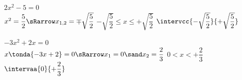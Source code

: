 {\(2x^2-5 = 0\) \\ 
\(x^2 =\dfrac{5}{2} \sRarrow x_{1, 2}= \mp \sqrt{\dfrac{5}{2}}\)}
{
  {}}
{
  {\(-\sqrt{\dfrac{5}{2}} \leqslant x \leqslant +\sqrt{\dfrac{5}{2}}\)}
  {\(\intervcc{-\sqrt{\dfrac{5}{2}}}{+\sqrt{\dfrac{5}{2}}}\)}}

{\(-3x^2 + 2x=0\) \\ 
\(x \tonda{-3x +2} = 0 \sRarrow x_{1}= 0 \sand x_{2}= \dfrac{2}{3}\)}
{
  {}}
{
  {\(0 < x < +\dfrac{2}{3}\)}
  {\(\intervaa{0}{+\dfrac{2}{3}}\)}}


